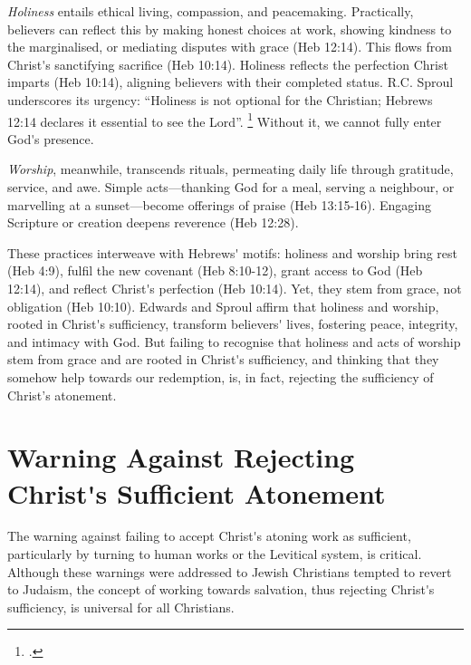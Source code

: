 \documentclass[12pt]{article}
\def\apos{^^27}         %
\def\christ{the Messiah}
\def\Christ{The Messiah}
\def\christ{Christ}
\def\Christ{Christ}
\begin{document}
\emph{Holiness} entails ethical living, compassion, and peacemaking.
%
Practically, believers can reflect this by making honest choices at work,
showing kindness to the marginalised, or mediating disputes with grace (Heb
12:14).
%
This flows from \christ{}\apos{}s sanctifying sacrifice (Heb 10:14).
%
Holiness reflects the perfection \christ{} imparts (Heb 10:14), aligning
believers with their completed status.
%
R.C. Sproul underscores its urgency: ``Holiness is not optional for the
Christian; Hebrews 12:14 declares it essential to see the Lord''.
\footcite[112]{Sproul1985}
%
Without it, we cannot fully enter God\apos{}s presence.

\emph{Worship}, meanwhile, transcends rituals, permeating daily life through
gratitude, service, and awe.
%
Simple acts---thanking God for a meal, serving a neighbour, or marvelling at a
sunset---become offerings of praise (Heb 13:15-16).
%
Engaging Scripture or creation deepens reverence (Heb 12:28).

These practices interweave with Hebrews\apos{} motifs: holiness and worship
bring rest (Heb 4:9), fulfil the new covenant (Heb 8:10-12), grant access to God
(Heb 12:14), and reflect \christ{}\apos{}s perfection (Heb 10:14).
%
Yet, they stem from grace, not obligation (Heb 10:10).
%
Edwards and Sproul affirm that holiness and worship, rooted in \christ{}\apos{}s
sufficiency, transform believers\apos{} lives, fostering peace, integrity, and
intimacy with God.
%
But failing to recognise that holiness and acts of worship stem from grace and
are rooted in \christ{}\apos{}s sufficiency, and thinking that they somehow help
towards our redemption, is, in fact, rejecting the sufficiency of \christ{}'s
atonement.

\section{Warning Against Rejecting \Christ{}\apos{}s Sufficient Atonement}
The warning against failing to accept \christ{}\apos{}s atoning work as
sufficient, particularly by turning to human works or the Levitical system, is
critical.
%
Although these warnings were addressed to Jewish Christians tempted to revert to
Judaism, the concept of working towards salvation, thus rejecting
\christ{}\apos{}s sufficiency, is universal for all Christians.
\end{document}

